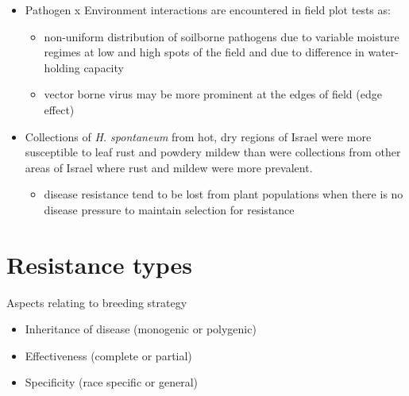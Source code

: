 \documentclass[11pt,dvipsnames,ignorenonframetext,aspectratio=169]{beamer}
\providecommand{\tightlist}{%
  \setlength{\itemsep}{0pt}\setlength{\parskip}{0pt}}
\begin{document}
\begin{frame}{}
\protect\hypertarget{section-9}{}
\begin{itemize}
\tightlist
\item
  Pathogen x Environment interactions are encountered in field plot
  tests as:

  \begin{itemize}
  \tightlist
  \item
    non-uniform distribution of soilborne pathogens due to variable
    moisture regimes at low and high spots of the field and due to
    difference in water-holding capacity
  \item
    vector borne virus may be more prominent at the edges of field (edge
    effect)
  \end{itemize}
\item
  Collections of \textit{H. spontaneum} from hot, dry regions of Israel
  were more susceptible to leaf rust and powdery mildew than were
  collections from other areas of Israel where rust and mildew were more
  prevalent.

  \begin{itemize}
  \tightlist
  \item
    disease resistance tend to be lost from plant populations when there
    is no disease pressure to maintain selection for resistance
  \end{itemize}
\end{itemize}
\end{frame}

\hypertarget{resistance-types}{%
\section{Resistance types}\label{resistance-types}}

\begin{frame}{Aspects relating to breeding strategy}
\protect\hypertarget{aspects-relating-to-breeding-strategy}{}
\begin{itemize}
\tightlist
\item
  Inheritance of disease (monogenic or polygenic)
\item
  Effectiveness (complete or partial)
\item
  Specificity (race specific or general)
\end{itemize}
\end{frame}
\end{document}
